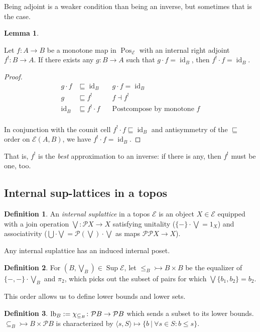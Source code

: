 \documentclass{article}
\makeatletter
\newcommand{\allproofs}{} %
\newif\ifproofsinappendix
\newcommand{\lemmawithproof}[3]{%
  \begin{lemma}\label{#1}
    #2  
    \ifproofsinappendix \hyperref[xxx#1]{(Proof)} \fi
  \end{lemma}
    \ifproofsinappendix
  \g@addto@macro\allproofs{%
    \par\medskip
    \noindent
    \subsection*{\cref{#1}}\par
    #2\par
    \begin{proof}\label{xxx#1}
      #3
    \end{proof}%
  }
      \else

    \begin{proof}
      #3
    \end{proof}
    \fi 
}
\theoremstyle{definition}
\newtheorem{definition}{Definition}[section]
\newtheorem{lemma}{Lemma}[section]
\newcommand{\cE}{\mathcal{E}}
\newcommand{\cP}{\mathcal{P}}
\newcommand{\id}{\operatorname{id}}
\newcommand{\Pos}{\operatorname{Pos}}
\newcommand{\Sup}{\operatorname{Sup}}
\makeatother
\begin{document}
Being adjoint is a weaker condition than being an inverse, but sometimes that is the case.

\lemmawithproof{lemma:adjinv}{
    Let $f\colon A\to B$ be a monotone map in $\Pos_\cE$ with an internal right adjoint $f^!\colon B\to A$. If there exists any  $g\colon B\to A$ such that $ g\cdot f = \id_B$, then $f^!\cdot f=\id_B$.
    }{

\begin{align*} g \cdot f &\sqsubseteq \id_B &&  g \cdot f = \id_B\\         
    g  &\sqsubseteq f^! && f\dashv f^!\\ 
    \id_B  &\sqsubseteq f^!\cdot f && \text{Postcompose by monotone }f\\ 
\end{align*}

In conjunction with the counit cell $f^!\cdot f\sqsubseteq \id_B$ and antisymmetry of the $\sqsubseteq$ order on $\cE(A,B)$, we have $f^!\cdot f = \id_B$.
}

That is, $f^!$ is the {\it best} approximation to an inverse: if there is any, then $f^!$ must be one, too.


\subsection{Internal sup-lattices in a topos}

\begin{definition}
    \label{def:suplattice}
    An {\it internal suplattice} in a topos $\cE$ is an object $X \in \cE$ equipped with a join operation $\bigvee\colon \cP X \to X$ satisfying unitality ($\{-\}\cdot \bigvee = 1_X$) and associativity ($\bigcup \cdot \bigvee = \cP(\bigvee)\cdot \bigvee$ as maps $\cP\cP X\to X$). 
\end{definition}

Any internal suplattice has an induced internal poset.

\begin{definition}
    \label{def:order}
     For $(B,\bigvee_B)\in\Sup\cE$, let
    $\le_B\rightarrowtail B\times B$ be the equalizer of $\{-,-\}\cdot\bigvee_B$ and $\pi_2$, which picks out the subset of pairs for which $\bigvee\{b_1,b_2\} = b_2$.
\end{definition}

This order allows us to define lower bounds and lower sets.
\begin{definition}
    \label{def:lowerbound}
    ${\rm lb}_B:=\chi_{\subseteq_B}\colon \cP B \to \cP B$ which sends a subset to its lower bounds. $\subseteq_B\rightarrowtail B \times \cP B$ is characterized by  $\langle s,S\rangle \mapsto \{b\ |\ \forall s \in S\colon b \leq s \}$.
\end{definition}
\end{document}
